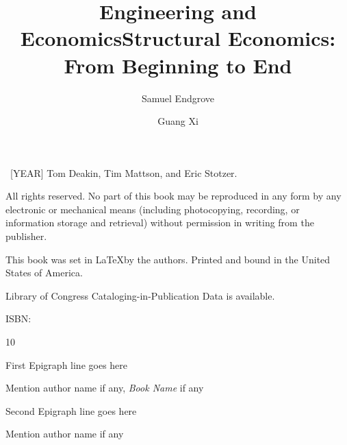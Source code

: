 \documentclass[7x10]{NewMath_MIT}
\begin{document}
\frontmatter


\halftitlepage

\begin{seriespage}
    \title{Engineering and Economics}
    \author{Samuel Endgrove}
    \title{Structural Economics: From Beginning to End}
    \author{Guang Xi}
\end{seriespage}






\begin{copyrightpage}
    \textcopyright\ [YEAR] Tom Deakin, Tim Mattson, and Eric Stotzer.
    
    All rights reserved. No part of this book may be reproduced in any form by any electronic or mechanical means (including photocopying, recording, or information storage and retrieval) without permission in writing from the publisher.
    
    This book was set in \LaTeX by the authors. Printed and bound in the United States of America.
    
    Library of Congress Cataloging-in-Publication Data is available.
    
    ISBN:
    
    10
\end{copyrightpage}
    
\dedication{Dedication text goes here}

\begin{epigraphpage}
\epigraph{First Epigraph line goes here}{Mention author name if any,
\textit{Book Name} if any}

\epigraph{Second Epigraph line goes here}{Mention author name if any}
\end{epigraphpage}


\tableofcontents

\listoffigures

\listoftables
\end{document}
